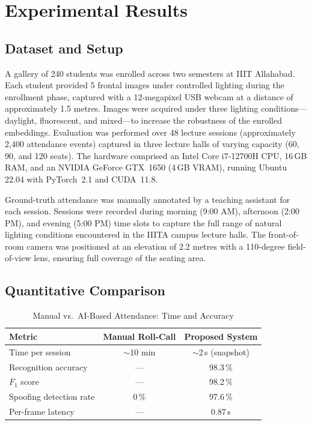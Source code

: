 \documentclass[conference, 10pt]{IEEEtran}
\begin{document}
\section{Experimental Results}
\label{sec:results}

\subsection{Dataset and Setup}

A gallery of 240 students was enrolled across two semesters at IIIT Allahabad.  Each student
provided 5 frontal images under controlled lighting during the enrollment phase, captured with
a 12-megapixel USB webcam at a distance of approximately 1.5 metres.  Images were acquired
under three lighting conditions---daylight, fluorescent, and mixed---to increase the
robustness of the enrolled embeddings.  Evaluation was performed over 48 lecture sessions
(approximately 2,400 attendance events) captured in three lecture halls of varying capacity
(60, 90, and 120 seats).  The hardware comprised an Intel Core i7-12700H CPU, 16\,GB RAM,
and an NVIDIA GeForce GTX~1650 (4\,GB VRAM), running Ubuntu 22.04 with PyTorch~2.1 and
CUDA~11.8.

Ground-truth attendance was manually annotated by a teaching assistant for each session.
Sessions were recorded during morning (9:00 AM), afternoon (2:00 PM), and evening (5:00 PM)
time slots to capture the full range of natural lighting conditions encountered in the IIITA
campus lecture halls.  The front-of-room camera was positioned at an elevation of 2.2 metres
with a 110-degree field-of-view lens, ensuring full coverage of the seating area.

\subsection{Quantitative Comparison}

\begin{table}[htbp]
\centering
\caption{Manual vs.\ AI-Based Attendance: Time and Accuracy}
\label{tab:comparison}
\begin{tabular}{lcc}
\toprule
\textbf{Metric} & \textbf{Manual Roll-Call} & \textbf{Proposed System} \\
\midrule
Time per session        & $\sim$10 min  & $\sim$2\,s (snapshot) \\
Recognition accuracy    & ---           & 98.3\,\%               \\
$F_1$ score             & ---           & 98.2\,\%               \\
Spoofing detection rate & 0\,\%         & 97.6\,\%               \\
Per-frame latency       & ---           & 0.87\,s                \\
\bottomrule
\end{tabular}
\end{table}
\end{document}
